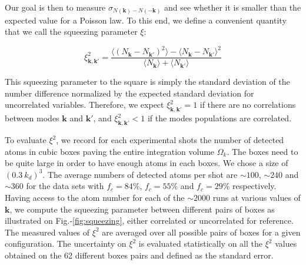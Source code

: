 Our goal is then to measure $\sigma_{N(\bm{k})-N(-\bm{k})}$ and see whether it is smaller than the expected value for a Poisson law. To this end, we define a convenient quantity that we call the squeezing parameter $\xi$: 

\begin{equation}
    \xi_{\bm{k},\bm{k'}}^2=\frac{\langle (N_{\bm{k}} - N_{\bm{k'}})^2 \rangle - \langle N_{\bm{k}} - N_{\bm{k'}} \rangle^2}{\langle N_{\bm{k}} \rangle + \langle N_{\bm{k'}} \rangle}
\end{equation}

This squeezing parameter to the square is simply the standard deviation of the number difference normalized by the expected standard deviation for uncorrelated variables. Therefore, we expect $\xi^2_{\bm{k},\bm{k}'}=1$ if there are no correlations between modes $\bm{k}$ and $\bm{k'}$, and $\xi^2_{\bm{k},\bm{k}'} < 1$ if the modes populations are correlated.

To evaluate $\xi^2$, we record for each experimental shots the number of detected atoms in cubic boxes paving the entire integration volume $\Omega_k$. The boxes need to be quite large in order to have enough atoms in each boxes. We chose a size of $(0.3 \ k_d)^3$. The average numbers of detected atoms per shot are $\sim 100$, $\sim 240$ and $\sim 360$ for the data sets with $f_c=84\%$, $f_c=55\%$ and $f_c=29\%$ respectively. Having access to the atom number for each of the $\sim 2000$ runs at various values of $\bm{k}$, we compute the squeezing parameter between different pairs of boxes as illustrated on Fig.-\ref{fig:squeezing}, either correlated or uncorrelated for reference. The measured values of $\xi^2$ are averaged over all possible pairs of boxes for a given configuration. The uncertainty on $\xi^2$ is evaluated statistically on all the $\xi^2$ values obtained on the 62 different boxes pairs and defined as the standard error.

